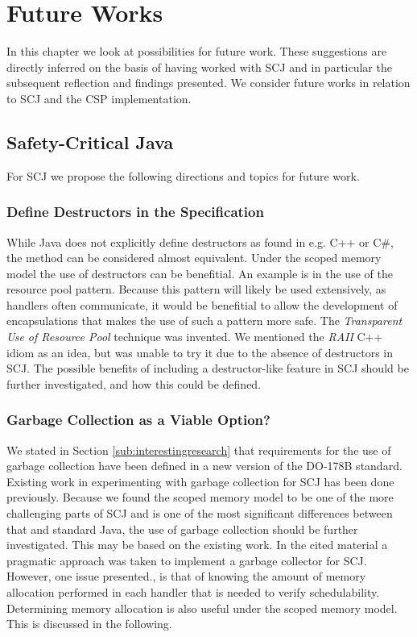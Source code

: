 \chapter{Future Works}
\label{chapter:FutureWorks}
In this chapter we look at possibilities for future work. These suggestions are directly inferred on the basis of having worked with SCJ and in particular the subsequent reflection and findings presented. We consider future works in relation to SCJ and the CSP implementation.

\section{Safety-Critical Java} %
\label{sec:scjfuture}
For SCJ we propose the following directions and topics for future work.

\subsection{Define Destructors in the Specification}
While Java does not explicitly define destructors as found in e.g. C++ or C\#, the  method can be considered almost equivalent. Under the scoped memory model the use of destructors can be benefitial. An example is in the use of the resource pool pattern. Because this pattern will likely be used extensively, as handlers often communicate, it would be benefitial to allow the development of encapsulations that makes the use of such a pattern more safe. The \textit{Transparent Use of Resource Pool} technique was invented. We mentioned the \textit{RAII} C++ idiom as an idea, but was unable to try it due to the absence of destructors in SCJ. The possible benefits of including a destructor-like feature in SCJ should be further investigated, and how this could be defined.

\subsection{Garbage Collection as a Viable Option?} %
\label{sub:garbage_collection_as_a_viable_option}
We stated in Section \ref{sub:interestingresearch} that requirements for the use of garbage collection have been defined in a new version of the DO-178B standard. Existing work in experimenting with garbage collection for SCJ has been done previously\cite{Schoeberl:2007:GCS:1288940.1288953}. Because we found the scoped memory model to be one of the more challenging parts of SCJ and is one of the most significant differences between that and standard Java, the use of garbage collection should be further investigated. This may be based on the existing work. In the cited material a pragmatic approach was taken to implement a garbage collector for SCJ. However, one issue presented., is that of knowing the amount of memory allocation performed in each handler that is needed to verify schedulability. Determining memory allocation is also useful under the scoped memory model. This is discussed in the following.

